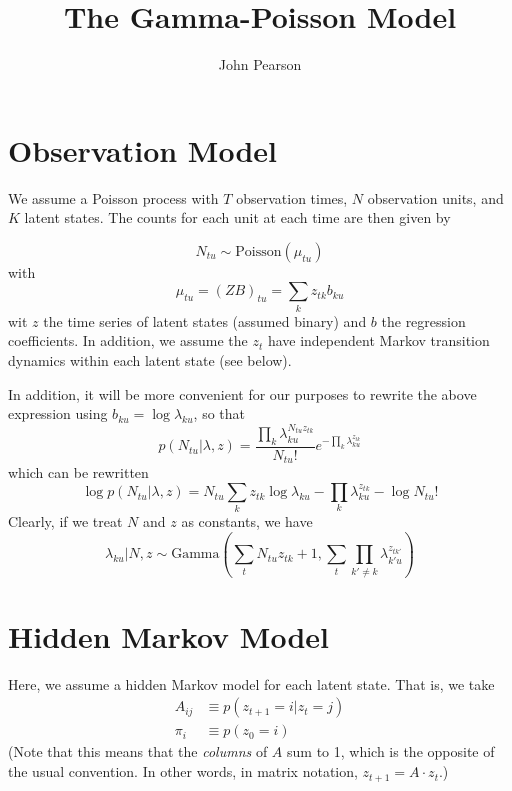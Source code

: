 \documentclass[11pt]{article}
\begin{document}
\title{The Gamma-Poisson Model}
\author{John Pearson}
\maketitle

\section{Observation Model}
We assume a Poisson process with $T$ observation times, $N$ observation units, and $K$ latent states. The counts for each unit at each time are then given by

\begin{equation}
    N_{tu} \sim \mathrm{Poisson}(\mu_{tu})
\end{equation}
with
\begin{equation}
   \mu_{tu} = (ZB)_{tu} = \sum_k z_{tk} b_{ku}
\end{equation}
wit $z$ the time series of latent states (assumed binary) and $b$ the regression coefficients. In addition, we assume the $z_t$ have independent Markov transition dynamics within each latent state (see below).

In addition, it will be more convenient for our purposes to rewrite the above expression using $b_{ku} = \log \lambda_{ku}$, so that
\begin{equation}
    p(N_{tu}|\lambda, z) = \frac{\prod_k \lambda_{ku}^{N_{tu} z_{tk}}}{N_{tu}!} e^{-\prod_k \lambda_{ku}^{z_{tk}}}
\end{equation}
which can be rewritten
\begin{equation}
    \log p(N_{tu}|\lambda, z) = N_{tu} \sum_k z_{tk} \log \lambda_{ku} - \prod_k \lambda_{ku}^{z_{tk}} - \log N_{tu}!
\end{equation}
Clearly, if we treat $N$ and $z$ as constants, we have
\begin{equation}
    \lambda_{ku}|N, z \sim \mathrm{Gamma}(\sum_t N_{tu}z_{tk} + 1, \sum_t\prod_{k'\neq k} \lambda_{k'u}^{z_{tk'}})
\end{equation}

\section{Hidden Markov Model}
Here, we assume a hidden Markov model for each latent state. That is, we take
\begin{align}
    A_{ij} &\equiv p(z_{t+1}=i|z_t = j) \\
    \pi_i &\equiv p(z_0 = i)
\end{align}
(Note that this means that the \emph{columns} of $A$ sum to 1, which is the opposite of the usual convention. In other words, in matrix notation, $z_{t+1} = A \cdot z_t$.)
\end{document}
